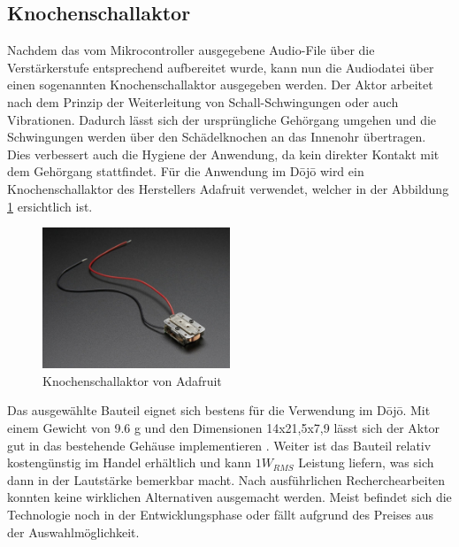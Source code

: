 \subsection{Knochenschallaktor} \label{sec:knochenschallaktor}

Nachdem das vom Mikrocontroller ausgegebene Audio-File über die Verstärkerstufe entsprechend aufbereitet wurde, kann nun die Audiodatei über einen sogenannten Knochenschallaktor ausgegeben werden.
Der Aktor arbeitet nach dem Prinzip der Weiterleitung von Schall-Schwingungen oder auch Vibrationen. Dadurch lässt sich der ursprüngliche Gehörgang umgehen und die Schwingungen werden über den Schädelknochen an das Innenohr übertragen. Dies verbessert auch die Hygiene der Anwendung, da kein direkter Kontakt mit dem Gehörgang stattfindet.\cite{Knochenschall}
Für die Anwendung im Dōjō wird ein Knochenschallaktor des Herstellers Adafruit verwendet, welcher in der Abbildung \ref{fig:knochenschallAda} ersichtlich ist.

\begin{figure}[htbp]
	\centering
	\includegraphics[width=0.5\textwidth]{Data/KnochenschallaktorAdafruit1}
	\caption[Knochenschallaktor \cite{BoneConductorAdafruit}]{Knochenschallaktor von Adafruit}
	\label{fig:knochenschallAda}
\end{figure} 

Das ausgewählte Bauteil eignet sich bestens für die Verwendung im Dōjō. Mit einem Gewicht von 9.6 g und den Dimensionen 14x21,5x7,9 lässt sich der Aktor gut in das bestehende Gehäuse implementieren \cite{BoneConductorAdafruit}. Weiter ist das Bauteil relativ kostengünstig im Handel erhältlich und kann $1W_{RMS}$ Leistung liefern, was sich dann in der Lautstärke bemerkbar macht. Nach ausführlichen Recherchearbeiten konnten keine wirklichen Alternativen ausgemacht werden. Meist befindet sich die Technologie noch in der Entwicklungsphase oder fällt aufgrund des Preises aus der Auswahlmöglichkeit.